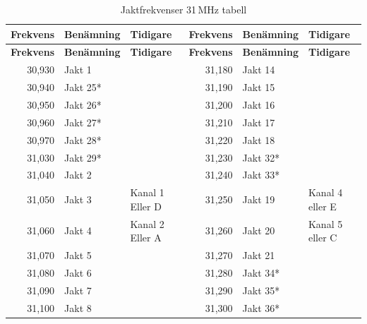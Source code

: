 \begin{longtable}{rll|rll}   %
	\caption{Jaktfrekvenser 31\,MHz tabell}\\
	\textbf{Frekvens} & \textbf{Benämning} & \textbf{Tidigare} & \textbf{Frekvens} & \textbf{Benämning} & \textbf{Tidigare} \\ \hline
		\endfirsthead
	\textbf{Frekvens} & \textbf{Benämning} & \textbf{Tidigare} & \textbf{Frekvens} & \textbf{Benämning} & \textbf{Tidigare} \\ \hline
	\endhead
	           30,930 & Jakt 1             &                   &   31,180          &   Jakt 14          &                   \\
	           30,940 & Jakt 25*           &                   &   31,190          &   Jakt 15          &                   \\
	           30,950 & Jakt 26*           &                   &   31,200          &   Jakt 16          &                   \\
	           30,960 & Jakt 27*           &                   &   31,210        &     Jakt 17        &                   \\
	           30,970 & Jakt 28*           &                   &   31,220          &   Jakt 18          &                   \\
	           31,030 & Jakt 29*           &                   &   31,230        &     Jakt 32*       &                   \\
	           31,040 & Jakt 2             &                   &   31,240         &    Jakt 33*        &                   \\
	           31,050 & Jakt 3             & Kanal 1 Eller D   &   31,250          &   Jakt 19          &  Kanal 4 eller E  \\
	           31,060 & Jakt 4             & Kanal 2 Eller A   &   31,260          &   Jakt 20         &   Kanal 5 eller C \\
	           31,070 & Jakt 5             &                   &   31,270          &   Jakt 21          &                   \\
	           31,080 & Jakt 6             &                   &   31,280          &   Jakt 34*         &                   \\
	           31,090 & Jakt 7             &                   &   31,290          &   Jakt 35*         &                   \\
	           31,100 & Jakt 8             &                   &   31,300          &   Jakt 36*         &                   \\

\end{longtable}
